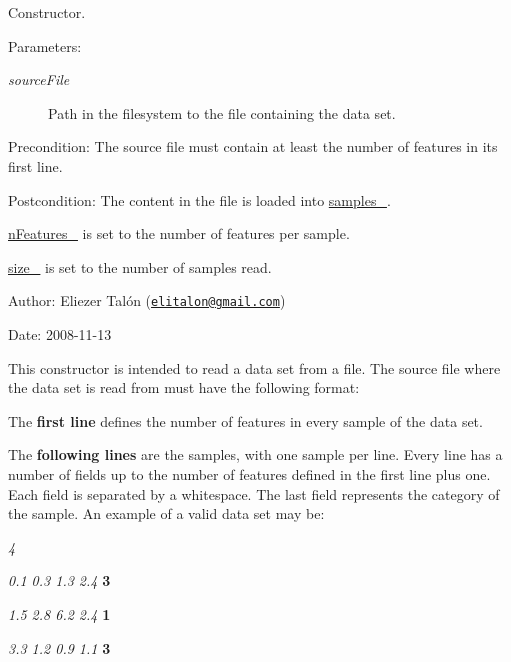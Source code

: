 Constructor. 

\begin{Desc}
\item[Parameters:]
\begin{description}
\item[{\em sourceFile}]Path in the filesystem to the file containing the data set.\end{description}
\end{Desc}
\begin{Desc}
\item[Precondition:]The source file must contain at least the number of features in its first line.\end{Desc}
\begin{Desc}
\item[Postcondition:]The content in the file is loaded into \hyperlink{class_data_set_a7fbe1c9b16c2a001635e153ec1ca326}{samples\_\-}. 

\hyperlink{class_data_set_5b263b90a7055808071f1c46e95b9b5c}{nFeatures\_\-} is set to the number of features per sample. 

\hyperlink{class_data_set_b25b58d12a1f41ec758471bb663c8fa5}{size\_\-} is set to the number of samples read.\end{Desc}
\begin{Desc}
\item[Author:]Eliezer Talón (\href{mailto:elitalon@gmail.com}{\tt elitalon@gmail.com}) \end{Desc}
\begin{Desc}
\item[Date:]2008-11-13\end{Desc}
This constructor is intended to read a data set from a file. The source file where the data set is read from must have the following format:

The {\bf first line} defines the number of features in every sample of the data set.

The {\bf following lines} are the samples, with one sample per line. Every line has a number of fields up to the number of features defined in the first line plus one. Each field is separated by a whitespace. The last field represents the category of the sample. An example of a valid data set may be:

{\em 4\/}

{\em 0.1 0.3 1.3 2.4\/} {\bf 3}

{\em 1.5 2.8 6.2 2.4\/} {\bf 1}

{\em 3.3 1.2 0.9 1.1\/} {\bf 3}


